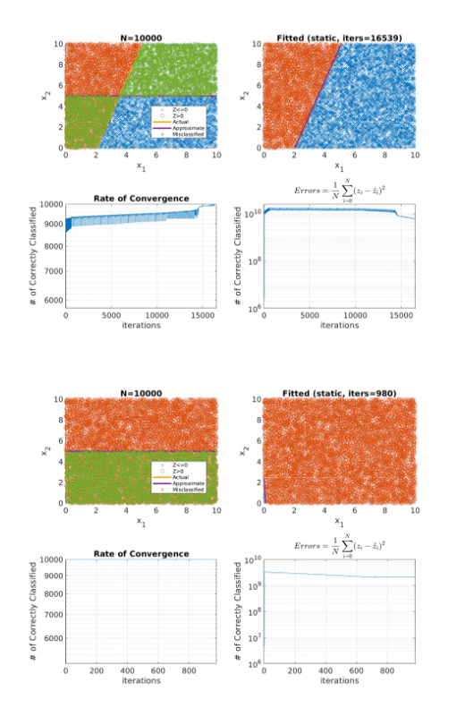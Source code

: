 \documentclass{article}
\newenvironment{Figure}
  {\par\medskip\noindent\minipage{\linewidth}}
  {\endminipage\par\medskip}
\begin{document}
\begin{multicols}{2}
\begin{Figure}
\end{Figure}
\begin{Figure}
\centering
\includegraphics[width=\linewidth]{pngs/n10000_static4.png}
\end{Figure}
\begin{Figure}
\centering
\includegraphics[width=\linewidth]{pngs/n10000_static5.png}
\end{Figure}


\end{multicols}
\end{document}
